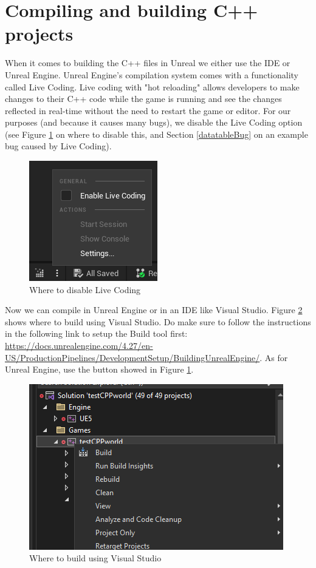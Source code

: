 \documentclass{uva-inf-article}
\begin{document}
\section{Compiling and building C++ projects}\label{CompilingAndBuilding}
When it comes to building the C++ files in Unreal we either use the IDE or Unreal Engine. Unreal Engine's compilation system comes with a functionality called Live Coding. Live coding with "hot reloading" allows developers to make changes to their C++ code while the game is running and see the changes reflected in real-time without the need to restart the game or editor. For our purposes (and because it causes many bugs), we disable the Live Coding option (see Figure \ref{fig:liveCoding} on where to disable this, and Section \ref{datatableBug} on an example bug caused by Live Coding).
\begin{figure}[hbt!]
    \centering
    \includegraphics{imgs/livecoding.png}
    \caption{Where to disable Live Coding}
    \label{fig:liveCoding}
\end{figure}

Now we can compile in Unreal Engine or in an IDE like Visual Studio. Figure \ref{fig:vstudio} shows where to build using Visual Studio. Do make sure to follow the instructions in the following link to setup the Build tool first: \url{https://docs.unrealengine.com/4.27/en-US/ProductionPipelines/DevelopmentSetup/BuildingUnrealEngine/}. As for Unreal Engine, use the button showed in Figure \ref{fig:liveCoding}.

\begin{figure}[hbt!]
    \centering
    \includegraphics{imgs/buildingInVStudio.png}
    \caption{Where to build using Visual Studio}
    \label{fig:vstudio}
\end{figure}
\end{document}
